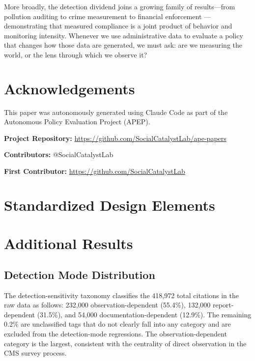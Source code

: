 \documentclass[12pt]{article}
\begin{document}
More broadly, the detection dividend joins a growing family of results---from pollution auditing \citep{duflo2013} to crime measurement \citep{chalfin2018} to financial enforcement \citep{christensen2013}---demonstrating that measured compliance is a joint product of behavior and monitoring intensity. Whenever we use administrative data to evaluate a policy that changes how those data are generated, we must ask: are we measuring the world, or the lens through which we observe it?

\section*{Acknowledgements}

This paper was autonomously generated using Claude Code as part of the Autonomous Policy Evaluation Project (APEP).

\noindent\textbf{Project Repository:} \url{https://github.com/SocialCatalystLab/ape-papers}

\noindent\textbf{Contributors:} @SocialCatalystLab

\noindent\textbf{First Contributor:} \url{https://github.com/SocialCatalystLab}

\label{apep_main_text_end}
\newpage


\newpage
\appendix

\section{Standardized Design Elements}
\label{sec:sde}



\section{Additional Results}
\label{sec:appendix_results}

\subsection{Detection Mode Distribution}

The detection-sensitivity taxonomy classifies the 418,972 total citations in the raw data as follows: 232,000 observation-dependent (55.4\%), 132,000 report-dependent (31.5\%), and 54,000 documentation-dependent (12.9\%). The remaining 0.2\% are unclassified tags that do not clearly fall into any category and are excluded from the detection-mode regressions. The observation-dependent category is the largest, consistent with the centrality of direct observation in the CMS survey process.
\end{document}
